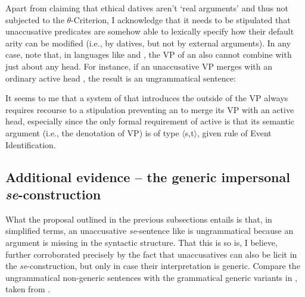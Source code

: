 \documentclass[output=paper,nonflat,newtxmath]{langsci/langscibook}
\begin{document}
\largerpage[2]
\noindent Apart from claiming that ethical datives aren't `real arguments' and thus not subjected to the $\theta$-Criterion, I acknowledge that it needs to be stipulated that unaccusative predicates are somehow able to lexically specify how their default arity can be modified (i.e., by datives, but not by external arguments). In any case, note that, in languages like  and , the VP of an  also cannot combine with just about any  head. For instance, if an unaccusative VP merges with an ordinary active  head , the result is an ungrammatical sentence:

\begin{exe}
 \label{janezje}
\end{exe}

\noindent It seems to me that a system of  that introduces the  outside of the VP always requires recourse to a stipulation preventing an  to merge its  VP with an active  head, especially since the only formal requirement of active  is that its semantic argument (i.e., the denotation of VP) is of type $\langle$s,t$\rangle$, given  rule of Event Identification.

\subsection{Additional evidence – the generic impersonal \textit{se}-construction}

What the proposal outlined in the previous subsections entails is that, in simplified terms, an unaccusative  \textit{se}-sentence like  is ungrammatical because an argument is missing in the syntactic structure. That this is so is, I believe, further corroborated precisely by the fact that unaccusatives can also be licit in the  \textit{se}-construction, but only in case their interpretation is generic. Compare the ungrammatical non-generic sentences  with the grammatical generic variants in , taken from \citet{ilcmarvin2016}.
\end{document}
